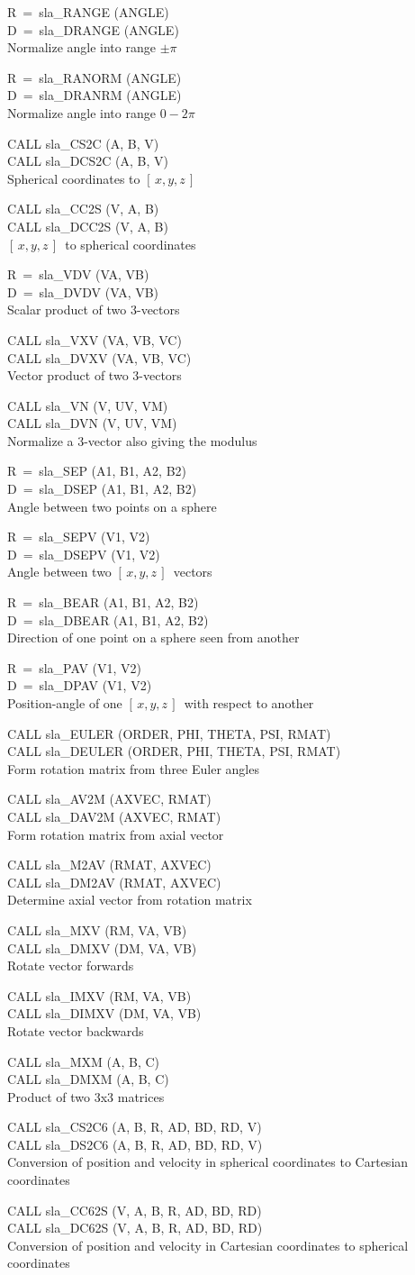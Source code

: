 \documentclass[11pt,twoside]{article}
\newcommand{\xyz}       {$[\,x,y,z\,]$}
\newcommand{\callhead}[1]{\goodbreak\vspace{\bigskipamount}{\large\bf{#1}}}
\newenvironment{callset}{\begin{list}{}{\setlength{\leftmargin}{2cm}
                             \setlength{\parsep}{\smallskipamount}}}{\end{list}}
\newcommand{\subq}[2]{\item\hspace{-1cm}#1\\\hspace*{-1cm}#2\\}
\begin{document}
\callhead{Angles, Vectors and Rotation Matrices}
\begin{callset}
\subq{R~=~sla\_RANGE (ANGLE)}
     {D~=~sla\_DRANGE (ANGLE)}
   Normalize angle into range $\pm\pi$
\subq{R~=~sla\_RANORM (ANGLE)}
     {D~=~sla\_DRANRM (ANGLE)}
   Normalize angle into range $0\!-\!2\pi$
\subq{CALL sla\_CS2C (A, B, V)}
     {CALL sla\_DCS2C (A, B, V)}
   Spherical coordinates to \xyz
\subq{CALL sla\_CC2S (V, A, B)}
     {CALL sla\_DCC2S (V, A, B)}
   \xyz\ to spherical coordinates
\subq{R~=~sla\_VDV (VA, VB)}
     {D~=~sla\_DVDV (VA, VB)}
   Scalar product of two 3-vectors
\subq{CALL sla\_VXV (VA, VB, VC)}
     {CALL sla\_DVXV (VA, VB, VC)}
   Vector product of two 3-vectors
\subq{CALL sla\_VN (V, UV, VM)}
     {CALL sla\_DVN (V, UV, VM)}
   Normalize a 3-vector also giving the modulus
\subq{R~=~sla\_SEP (A1, B1, A2, B2)}
     {D~=~sla\_DSEP (A1, B1, A2, B2)}
   Angle between two points on a sphere
\subq{R~=~sla\_SEPV (V1, V2)}
     {D~=~sla\_DSEPV (V1, V2)}
   Angle between two \xyz\ vectors
\subq{R~=~sla\_BEAR (A1, B1, A2, B2)}
     {D~=~sla\_DBEAR (A1, B1, A2, B2)}
   Direction of one point on a sphere seen from another
\subq{R~=~sla\_PAV (V1, V2)}
     {D~=~sla\_DPAV (V1, V2)}
   Position-angle of one \xyz\ with respect to another
\subq{CALL sla\_EULER (ORDER, PHI, THETA, PSI, RMAT)}
     {CALL sla\_DEULER (ORDER, PHI, THETA, PSI, RMAT)}
   Form rotation matrix from three Euler angles
\subq{CALL sla\_AV2M (AXVEC, RMAT)}
     {CALL sla\_DAV2M (AXVEC, RMAT)}
   Form rotation matrix from axial vector
\subq{CALL sla\_M2AV (RMAT, AXVEC)}
     {CALL sla\_DM2AV (RMAT, AXVEC)}
   Determine axial vector from rotation matrix
\subq{CALL sla\_MXV (RM, VA, VB)}
     {CALL sla\_DMXV (DM, VA, VB)}
   Rotate vector forwards
\subq{CALL sla\_IMXV (RM, VA, VB)}
     {CALL sla\_DIMXV (DM, VA, VB)}
   Rotate vector backwards
\subq{CALL sla\_MXM (A, B, C)}
     {CALL sla\_DMXM (A, B, C)}
   Product of two 3x3 matrices
\subq{CALL sla\_CS2C6 (A, B, R, AD, BD, RD, V)}
     {CALL sla\_DS2C6 (A, B, R, AD, BD, RD, V)}
   Conversion of position and velocity in spherical
     coordinates to Cartesian coordinates
\subq{CALL sla\_CC62S (V, A, B, R, AD, BD, RD)}
     {CALL sla\_DC62S (V, A, B, R, AD, BD, RD)}
   Conversion of position and velocity in Cartesian
     coordinates to spherical coordinates
\end{callset}
\end{document}
